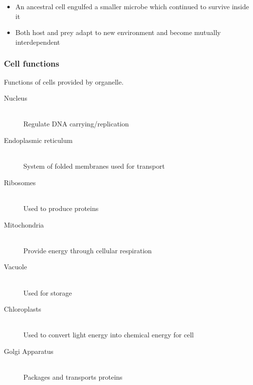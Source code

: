 \documentclass[a4paper]{article}
\begin{document}

\begin{itemize}
  \item An ancestral cell engulfed a smaller microbe which continued to survive
        inside it
  \item Both host and prey adapt to new environment and become mutually
        interdependent
\end{itemize}

\subsubsection{Cell functions}

Functions of cells provided by organelle.

\begin{description}
  \item[Nucleus] \hfill \\
    Regulate DNA carrying/replication
  \item[Endoplasmic reticulum] \hfill \\
    System of folded membranes used for transport
  \item[Ribosomes] \hfill \\
    Used to produce proteins
  \item[Mitochondria] \hfill \\
    Provide energy through cellular respiration
  \item[Vacuole] \hfill \\
    Used for storage
  \item[Chloroplasts] \hfill \\
    Used to convert light energy into chemical energy for cell
  \item[Golgi Apparatus] \hfill \\
    Packages and transports proteins
\end{description}
\end{document}

